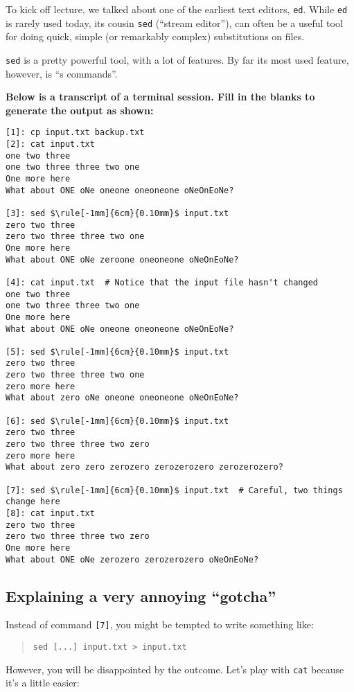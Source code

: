 \documentclass{article}
\begin{document}
To kick off lecture, we talked about one of the earliest text editors,
\texttt{ed}. While \texttt{ed} is rarely used today, its cousin
\texttt{sed} (``stream editor''), can often be a useful tool for
doing quick, simple (or remarkably complex) substitutions on files.

\medskip
\noindent
\texttt{sed} is a pretty powerful tool, with a lot of features. By far its most
used feature, however, is ``s commands''.

\medskip
\noindent
\textbf{Below is a transcript of a terminal session. Fill in the blanks to
generate the output as shown:}


\begin{lstlisting}[mathescape=true]
[1]: cp input.txt backup.txt
[2]: cat input.txt
one two three
one two three three two one
One more here
What about ONE oNe oneone oneoneone oNeOnEoNe?

[3]: sed $\rule[-1mm]{6cm}{0.10mm}$ input.txt
zero two three
zero two three three two one
One more here
What about ONE oNe zeroone oneoneone oNeOnEoNe?

[4]: cat input.txt  # Notice that the input file hasn't changed
one two three
one two three three two one
One more here
What about ONE oNe oneone oneoneone oNeOnEoNe?

[5]: sed $\rule[-1mm]{6cm}{0.10mm}$ input.txt
zero two three
zero two three three two one
zero more here
What about zero oNe oneone oneoneone oNeOnEoNe?

[6]: sed $\rule[-1mm]{6cm}{0.10mm}$ input.txt
zero two three
zero two three three two zero
zero more here
What about zero zero zerozero zerozerozero zerozerozero?

[7]: sed $\rule[-1mm]{6cm}{0.10mm}$ input.txt  # Careful, two things change here
[8]: cat input.txt
zero two three
zero two three three two zero
One more here
What about ONE oNe zerozero zerozerozero oNeOnEoNe?
\end{lstlisting}


\subsection*{Explaining a very annoying ``gotcha''}

Instead of command \texttt{[7]}, you might be tempted to write something like:
\begin{quote}
  \texttt{sed [...]\ input.txt > input.txt}
\end{quote}
However, you will be disappointed by the outcome. Let's play with \texttt{cat}
because it's a little easier:
\end{document}
